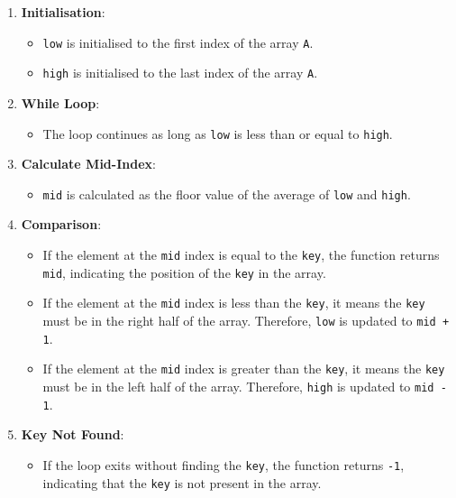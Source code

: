 \begin{enumerate}
    \item \textbf{Initialisation}:
        \begin{itemize}
            \item \texttt{low} is initialised to the first index of the array \texttt{A}.
            \item \texttt{high} is initialised to the last index of the array \texttt{A}.
        \end{itemize}
    \item \textbf{While Loop}:
        \begin{itemize}
            \item The loop continues as long as \texttt{low} is less than or equal to \texttt{high}.
        \end{itemize}
    \item \textbf{Calculate Mid-Index}:
        \begin{itemize}
            \item \texttt{mid} is calculated as the floor value of the average of \texttt{low} and \texttt{high}.
        \end{itemize}
    \item \textbf{Comparison}:
        \begin{itemize}
            \item If the element at the \texttt{mid} index is equal to the \texttt{key}, the function returns \texttt{mid}, indicating the position of the \texttt{key} in the array.
            \item If the element at the \texttt{mid} index is less than the \texttt{key}, it means the \texttt{key} must be in the right half of the array. Therefore, \texttt{low} is updated to \texttt{mid + 1}.
            \item If the element at the \texttt{mid} index is greater than the \texttt{key}, it means the \texttt{key} must be in the left half of the array. Therefore, \texttt{high} is updated to \texttt{mid - 1}.
        \end{itemize}
    \item \textbf{Key Not Found}:
        \begin{itemize}
            \item If the loop exits without finding the \texttt{key}, the function returns \texttt{-1}, indicating that the \texttt{key} is not present in the array.
        \end{itemize}
\end{enumerate}

